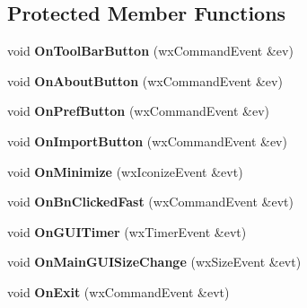 \subsection*{Protected Member Functions}
\begin{DoxyCompactItemize}
\item 
void {\bfseries OnToolBarButton} (wxCommandEvent \&ev)\label{classCamuleDlg_a3ef753b3cc706678cbb85ef2fbe2a361}

\item 
void {\bfseries OnAboutButton} (wxCommandEvent \&ev)\label{classCamuleDlg_a9b3aec1da9f8c6922cc71c717451abe6}

\item 
void {\bfseries OnPrefButton} (wxCommandEvent \&ev)\label{classCamuleDlg_ac2b163be510d34f846b9fbe5b69e55ab}

\item 
void {\bfseries OnImportButton} (wxCommandEvent \&ev)\label{classCamuleDlg_a6a38461fdec4cbbedbe2568dd9df56b0}

\item 
void {\bfseries OnMinimize} (wxIconizeEvent \&evt)\label{classCamuleDlg_a7dd916e29dbe3515536329f4b1933f9f}

\item 
void {\bfseries OnBnClickedFast} (wxCommandEvent \&evt)\label{classCamuleDlg_aa1f6588d67594543810e0941b29efde4}

\item 
void {\bfseries OnGUITimer} (wxTimerEvent \&evt)\label{classCamuleDlg_ab28dad415c6f18370a5e9eafc0607e35}

\item 
void {\bfseries OnMainGUISizeChange} (wxSizeEvent \&evt)\label{classCamuleDlg_a347fce1464de6bdbaa7964bf3a84df85}

\item 
void {\bfseries OnExit} (wxCommandEvent \&evt)\label{classCamuleDlg_a2afa9eeb3a129ad2ce8c8807c1224d47}

\end{DoxyCompactItemize}
